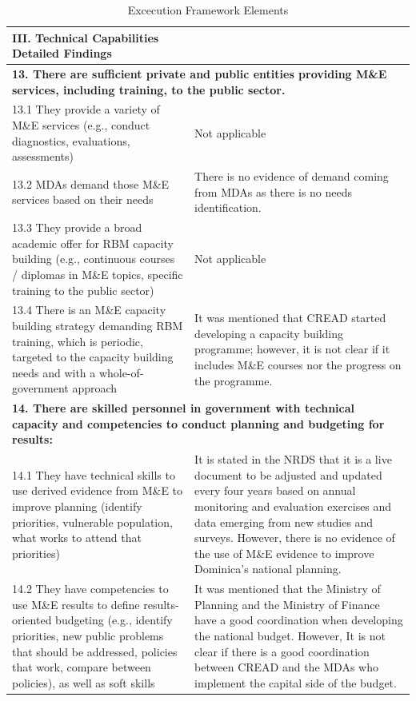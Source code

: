 \documentclass[
  10pt,
]{book}
\begin{document}
\begin{table}

\caption{\label{tab:unnamed-chunk-12}Excecution Framework Elements}
\centering
\begin{tabular}[t]{l|l}
\hline
III. Technical Capabilities Detailed Findings &  \\
\hline
\multicolumn{2}{l}{\textbf{13. There are sufficient private and public entities providing M\&E services, including training, to the public sector.}}\\
\hline
\hspace{1em}13.1 They provide a variety of M\&E services (e.g., conduct diagnostics, evaluations, assessments) & Not applicable\\
\hline
\hspace{1em}13.2 MDAs demand those M\&E services based on their needs & There is no evidence of demand coming from MDAs as there is no needs identification.\\
\hline
\hspace{1em}13.3 They provide a broad academic offer for RBM capacity building (e.g., continuous courses / diplomas in M\&E topics, specific training to the public sector) & Not applicable\\
\hline
\hspace{1em}13.4 There is an M\&E capacity building strategy demanding RBM training, which is periodic, targeted to the capacity building needs and with a whole-of-government approach & It was mentioned that CREAD started developing a capacity building programme; however, it is not clear if it includes M\&E courses nor the progress on the programme.\\
\hline
\multicolumn{2}{l}{\textbf{14. There are skilled personnel in government with technical capacity and competencies to conduct planning and budgeting for results:}}\\
\hline
\hspace{1em}14.1 They have technical skills to use derived evidence from M\&E to improve planning (identify priorities, vulnerable population, what works to attend that priorities) & It is stated in the NRDS that it is a live document to be adjusted and updated every four years based on annual monitoring and evaluation exercises and data emerging from new studies and surveys. However, there is no evidence of the use of M\&E evidence to improve Dominica’s national planning.\\
\hline
\hspace{1em}14.2 They have competencies to use M\&E results to define results-oriented budgeting (e.g., identify priorities, new public problems that should be addressed, policies that work, compare between policies), as well as soft skills & It was mentioned that the Ministry of Planning and the Ministry of Finance have a good coordination when developing the national budget. However, It is not clear if there is a good coordination between CREAD and the MDAs who implement the capital side of the budget.\\

\end{tabular}
\end{table}
\end{document}
